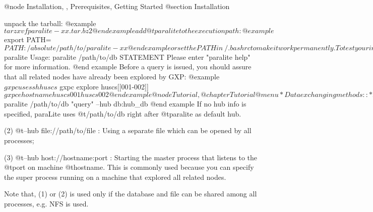 @node Installation,  , Prerequisites, Getting Started
@section Installation

unpack the tarball:
@example
    $ tar zxvf paralite-xx.tar.bz2
@end example
add @t{paralite} to the execution path:
@example
    $ export PATH=$PATH:/absolute/path/to/paralite-xx
@end example
or set the PATH in ~/.bashrc to make it work permanently.

To test your installation, type @t{paralite} to your shell prompt and see
something like this.
@example
$ paralite
  Usage: paralite /path/to/db STATEMENT 
  Please enter "paralite help" for more information.
@end example
Before a query is issued, you should assure that all related nodes have already
been explored by GXP:
@example
$ gxpc use ssh huscs 
$ gxpc explore huscs[[001-002]]       
$ gxpc e hostname
  huscs001
  huscs002
@end example

@node Tutorial, 
@chapter Tutorial

@menu
* Data exchanging methods::
* Performing general SQL query::   
* Performing collective query::  
* Special Command::
* Quick Reference of Frequently Used Commands::  
@end menu

@section Processes coordination methods

ParaLite is server-less and zero-configuration system, that is, you don't need
start any process and specify any configuration before SQL is executed. To achieve this,
a super process should be started to coordinate all other processes after they are started. 
Then where to start the super process and how everybody knows it? You need to specify
hub information at the end of each query using three methods:

(1) @t{--hub db:hub_db} : Using a database as a hub;

@example
$ paralite /path/to/db "query" --hub db:hub_db
@end example
If no hub info is specified, paraLite uses @t{/path/to/db} right after @t{paralite}
as default hub. 

(2) @t{--hub file://path/to/file} : Using a separate file 
which can be opened by all processes;

(3) @t{--hub host://hostname:port} : Starting the master process that listens 
to the @t{port} on machine @t{hostname}. This is commonly used because you
can specify the super process running on a machine that explored all related nodes.

Note that, (1) or (2) is used only if the database and file can be shared among all 
processes, e.g. NFS is used. 

